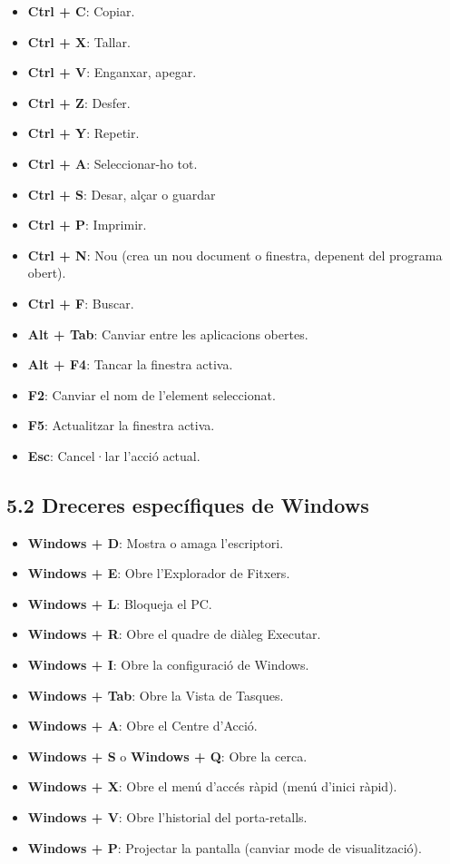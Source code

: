 \documentclass[
  a4paper,
]{article}
\providecommand{\tightlist}{%
  \setlength{\itemsep}{0pt}\setlength{\parskip}{0pt}}
\begin{document}
\begin{itemize}
\tightlist
\item
  \textbf{Ctrl + C}: Copiar.
\item
  \textbf{Ctrl + X}: Tallar.
\item
  \textbf{Ctrl + V}: Enganxar, apegar.
\item
  \textbf{Ctrl + Z}: Desfer.
\item
  \textbf{Ctrl + Y}: Repetir.
\item
  \textbf{Ctrl + A}: Seleccionar-ho tot.
\item
  \textbf{Ctrl + S}: Desar, alçar o guardar
\item
  \textbf{Ctrl + P}: Imprimir.
\item
  \textbf{Ctrl + N}: Nou (crea un nou document o finestra, depenent del
  programa obert).
\item
  \textbf{Ctrl + F}: Buscar.
\item
  \textbf{Alt + Tab}: Canviar entre les aplicacions obertes.
\item
  \textbf{Alt + F4}: Tancar la finestra activa.
\item
  \textbf{F2}: Canviar el nom de l'element seleccionat.
\item
  \textbf{F5}: Actualitzar la finestra activa.
\item
  \textbf{Esc}: Cancel·lar l'acció actual.
\end{itemize}

\subsection{5.2 Dreceres específiques de
Windows}\label{dreceres-especuxedfiques-de-windows}

\begin{itemize}
\tightlist
\item
  \textbf{Windows + D}: Mostra o amaga l'escriptori.
\item
  \textbf{Windows + E}: Obre l'Explorador de Fitxers.
\item
  \textbf{Windows + L}: Bloqueja el PC.
\item
  \textbf{Windows + R}: Obre el quadre de diàleg Executar.
\item
  \textbf{Windows + I}: Obre la configuració de Windows.
\item
  \textbf{Windows + Tab}: Obre la Vista de Tasques.
\item
  \textbf{Windows + A}: Obre el Centre d'Acció.
\item
  \textbf{Windows + S} o \textbf{Windows + Q}: Obre la cerca.
\item
  \textbf{Windows + X}: Obre el menú d'accés ràpid (menú d'inici ràpid).
\item
  \textbf{Windows + V}: Obre l'historial del porta-retalls.
\item
  \textbf{Windows + P}: Projectar la pantalla (canviar mode de
  visualització).
\end{itemize}
\end{document}
